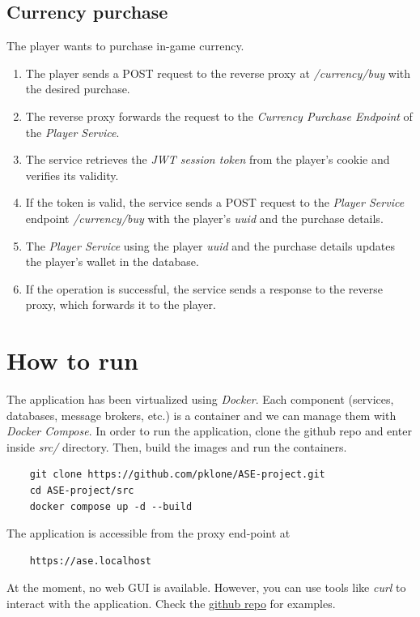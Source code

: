 \documentclass{article}
\begin{document}
\subsection{Currency purchase}
The player wants to purchase in-game currency.
\begin{enumerate}
\item The player sends a POST request to the reverse proxy at \emph{/currency/buy} with the desired purchase.
\item The reverse proxy forwards the request to the \emph{Currency Purchase Endpoint} of the \emph{Player Service}.
\item The service retrieves the \emph{JWT session token} from the player's cookie and verifies its validity.
\item If the token is valid, the service sends a POST request to the \emph{Player Service} endpoint \emph{/currency/buy} with the player's \emph{uuid} and the purchase details.
\item The \emph{Player Service} using the player \emph{uuid} and the purchase details updates the player's wallet in the database.
\item If the operation is successful, the service sends a response to the reverse proxy, which forwards it to the player.
\end{enumerate}

\section{How to run}
The application has been virtualized using \emph{Docker}. Each component (services, databases, message brokers, etc.) is a container and we can manage them with \emph{Docker Compose}. In order to run the application, clone the github repo and enter inside \emph{src/} directory. Then, build the images and run the containers.
\begin{verbatim}
    git clone https://github.com/pklone/ASE-project.git
    cd ASE-project/src
    docker compose up -d --build
\end{verbatim}
The application is accessible from the proxy end-point at
\begin{verbatim}
    https://ase.localhost
\end{verbatim}
At the moment, no web GUI is available. However, you can use tools like \emph{curl} to interact with the application. Check the \href{https://github.com/pklone/ASE-project/test/README.md}{github repo} for examples.
\end{document}
